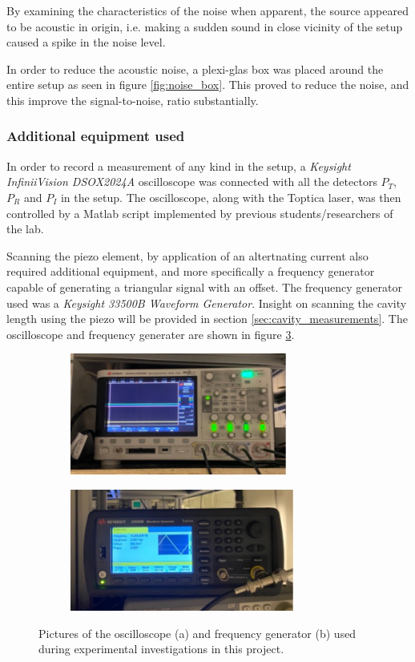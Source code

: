 By examining the characteristics of the noise when apparent, the source appeared to be acoustic in origin, i.e. making a sudden sound in close vicinity of the setup caused a spike in the noise level.

In order to reduce the acoustic noise, a plexi-glas box was placed around the entire setup as seen in figure \ref{fig:noise_box}. This proved to reduce the noise, and this improve the signal-to-noise, ratio substantially.

\subsubsection{Additional equipment used}

In order to record a measurement of any kind in the setup, a \emph{Keysight InfiniiVision DSOX2024A} oscilloscope was connected with all the detectors $P_T$, $P_R$ and $P_I$ in the setup. The oscilloscope, along with the Toptica laser, was then controlled by a Matlab script implemented by previous students/researchers of the lab. 

Scanning the piezo element, by application of an altertnating current also required additional equipment, and more specifically a frequency generator capable of generating a triangular signal with an offset. The frequency generator used was a \emph{Keysight 33500B Waveform Generator}. Insight on scanning the cavity length using the piezo will be provided in section \ref{sec:cavity_measurements}. The oscilloscope and frequency generater are shown in figure \ref{fig:scope_and_freq_generator}.

\begin{figure}[h!]
    \centering
    \begin{subfigure}[b]{0.49\textwidth}
        \centering
        \includegraphics[height=4cm]{figures/scope.pdf}
        \caption{}
        \label{fig:scope}
    \end{subfigure}
    \begin{subfigure}[b]{0.49\textwidth}
        \centering
        \includegraphics[height=4cm]{figures/frequency_generator.pdf}
        \caption{}
        \label{fig:freq_generator}
    \end{subfigure}
    \caption{Pictures of the oscilloscope (a) and frequency generator (b) used during experimental investigations in this project.}
    \label{fig:scope_and_freq_generator}
\end{figure}
